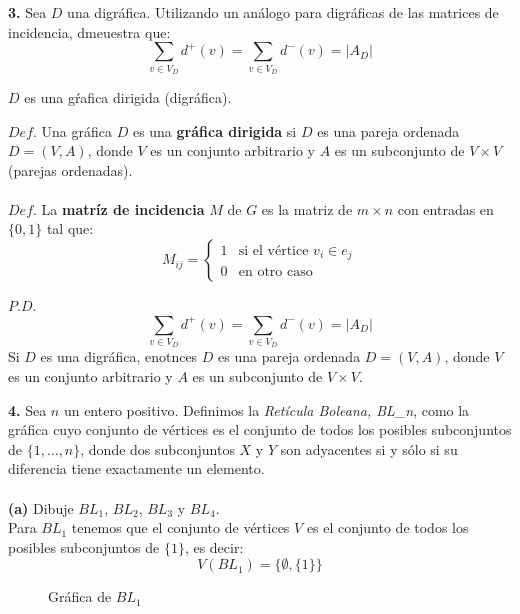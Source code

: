 \documentclass[12pt]{article}
\begin{document}
\textbf{3.} Sea $D$ una digráfica. Utilizando un análogo para digráficas de las matrices de incidencia, dmeuestra que:\\
\[
\sum_{\displaystyle v \in V_D} d^{+}(v) = \sum_{\displaystyle v \in V_D} d^{-}(v) = |A_D|
\]
\begin{tcolorbox}[title=\textbf{Hipotesis}, colback=red!15!white, colframe=black!]
    $D$ es una gŕafica dirigida (digráfica).
\end{tcolorbox}
\begin{tcolorbox}[title=\textbf{Definiciones}, colback=blue!15!white, colframe=black!]
    $Def$. Una gráfica $D$ es una \textbf{gráfica dirigida} si $D$ es una pareja ordenada $D=(V,A)$, donde
    $V$ es un conjunto arbitrario y $A$ es un subconjunto de $V \times V$ (parejas ordenadas).
    \\
    \\
    $Def$. La \textbf{matríz de incidencia} $M$ de $G$ es la matriz de $m \times n$ con entradas en $\{0, 1\}$ tal que:
    \[M_{ij} = \begin{cases} 1 & \text{si el vértice } v_i \in e_j\\ 0 & \text{en otro caso} \end{cases}\]

\end{tcolorbox}

$P.D.$
\[\sum_{\displaystyle v \in V_D} d^{+}(v) = \sum_{\displaystyle v \in V_D} d^{-}(v) = |A_D|\]
Si $D$ es una digráfica, enotnces $D$ es una pareja ordenada $D=(V,A)$, donde $V$ es un conjunto arbitrario y $A$ es un subconjunto de $V \times V$.

\vspace{1cm}

\textbf{4.} Sea $n$ un entero positivo. Definimos la \textit{Retícula Boleana, BL\_n}, como
la gráfica cuyo conjunto de vértices es el conjunto de todos los posibles subconjuntos
de $\{1, ..., n\}$, donde dos subconjuntos $X$ y $Y$ son adyacentes si y sólo si su diferencia
tiene exactamente un elemento.\\
\\
\textbf{(a)} Dibuje $BL_1$, $BL_2$, $BL_3$ y $BL_4$.
\\

Para $BL_1$ tenemos que el conjunto de vértices $V$ es el conjunto de todos los posibles subconjuntos de $\{1\}$, es decir:
\[V(BL_1) = \{\emptyset, \{1\}\}\]

\begin{figure}[h!]
    \centering
    \begin{minipage}{0.4\textwidth}
        \centering
        \caption{Gráfica de $BL_1$}
    \end{minipage}
\end{figure}
\end{document}

